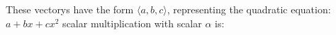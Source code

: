 \documentclass[preview]{standalone}
\begin{document}
\begin{center}
These vectorys have the form $\langle a, b, c\rangle$, representing the quadratic equation: $a+bx+cx^2$ scalar multiplication with scalar $\alpha$ is:
\end{center}
\end{document}
